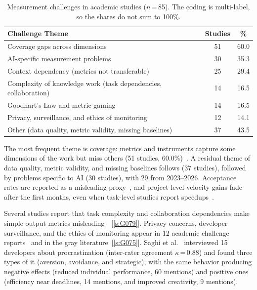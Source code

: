 \documentclass[preprint,number]{elsarticle}
\newcommand{\refG}[1]{\ref{s:#1}}
\begin{document}
\begin{table}[htbp]
\centering
\caption{Measurement challenges in academic studies ($n$\,=\,85). The coding is multi-label, so the shares do not sum to 100\%.}
\label{tab:challenges}
\footnotesize
\begin{tabular}{>{\raggedright\arraybackslash}p{4.6cm} c c}
\toprule
\textbf{Challenge Theme} & \textbf{Studies} & \textbf{\%} \\
\midrule
Coverage gaps across dimensions & 51 & 60.0 \\
AI-specific measurement problems & 30 & 35.3 \\
Context dependency (metrics not transferable) & 25 & 29.4 \\
Complexity of knowledge work (task dependencies, collaboration) & 14 & 16.5 \\
Goodhart's Law and metric gaming & 14 & 16.5 \\
Privacy, surveillance, and ethics of monitoring & 12 & 14.1 \\
Other (data quality, metric validity, missing baselines) & 37 & 43.5 \\
\bottomrule
\end{tabular}
\end{table}

The most frequent theme is coverage: metrics and instruments capture some dimensions of the work but miss others (51 studies, 60.0\%)~\cite{P0021, P1280, P0244, P2078}. A residual theme of data quality, metric validity, and missing baselines follows (37 studies), followed by problems specific to AI (30 studies), with 29 from 2023--2026. Acceptance rates are reported as a misleading proxy~\cite{P2028, P2100}, and project-level velocity gains fade after the first months, even when task-level studies report speedups~\cite{P2032}. 

Several studies report that task complexity and collaboration dependencies make simple output metrics misleading~\cite{P0061, P1259, P2106, P2116}~[\refG{G079}]. Privacy concerns, developer surveillance, and the ethics of monitoring appear in 12 academic challenge reports~\cite{P1259, P2101, P2125} and in the gray literature~[\refG{G075}].
Saghi et al.~\cite{P0181} interviewed 15 developers about procrastination (inter-rater agreement $\kappa$\,=\,0.88) and found three types of it (aversion, avoidance, and strategic), with the same behavior producing negative effects (reduced individual performance, 60 mentions) and positive ones (efficiency near deadlines, 14 mentions, and improved creativity, 9 mentions).
\end{document}
